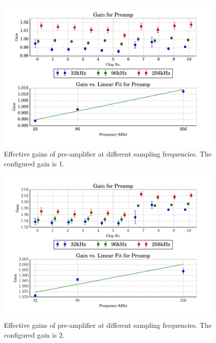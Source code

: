 \begin{figure}
    \centering
    \includegraphics[width=\linewidth]{images/plots/dc_slope_preamp_gain+1.pdf}
    \caption{Effective gains of pre-amplifier at different sampling frequencies. The configured gain is 1.}
    \label{fig:preamp_slope+1}
\end{figure}
\begin{figure}
    \centering
    \includegraphics[width=\linewidth]{images/plots/dc_slope_preamp_gain+2.pdf}
    \caption{Effective gains of pre-amplifier at different sampling frequencies. The configured gain is 2.}
    \label{fig:preamp_slope+2}
\end{figure}
